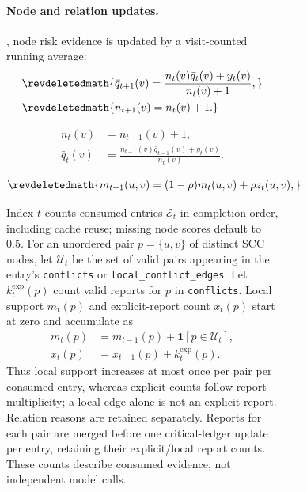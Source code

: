 \documentclass[11pt]{article}
\begin{document}
\begin{figure}[!t]
\begin{figure}[!t]
\paragraph{Node and relation updates.}
, node risk evidence is updated by a visit-counted running average:
\ifrevisionmarks
\[
\begin{aligned}
    &\revdeletedmath{\bar{q}_{t+1}(v)=
    \frac{n_t(v)\bar{q}_t(v)+y_t(v)}
    {n_t(v)+1},}\\
    &\revdeletedmath{n_{t+1}(v)=n_t(v)+1.}
\end{aligned}
\]
\fi
\begin{revadded}
\begin{equation}
    \begin{aligned}
    n_t(v)&=n_{t-1}(v)+1,\\
    \bar q_t(v)&=\frac{n_{t-1}(v)\bar q_{t-1}(v)+y_t(v)}{n_t(v)}.
    \end{aligned}
    \label{eq:node-update}
\end{equation}
\end{revadded}
\ifrevisionmarks
\[
    \revdeletedmath{m_{t+1}(u,v)=(1-\rho)m_t(u,v)+\rho z_t(u,v),}
\]
\fi
{}
\begin{revadded}
Index $t$ counts consumed entries $\mathcal E_t$ in completion order, including cache reuse; missing node scores default to $0.5$. For an unordered pair $p=\{u,v\}$ of distinct SCC nodes, let $\mathcal U_t$ be the set of valid pairs appearing in the entry's \texttt{conflicts} or \texttt{local\_conflict\_edges}. Let $k_t^{\mathrm{exp}}(p)$ count valid reports for $p$ in \texttt{conflicts}. Local support $m_t(p)$ and explicit-report count $x_t(p)$ start at zero and accumulate as
\begin{equation}
    \begin{aligned}
    m_t(p)&=m_{t-1}(p)+\mathbf{1}[p\in\mathcal U_t],\\
    x_t(p)&=x_{t-1}(p)+k_t^{\mathrm{exp}}(p).
    \end{aligned}
    \label{eq:relation-update}
\end{equation}
Thus local support increases at most once per pair per consumed entry, whereas explicit counts follow report multiplicity; a local edge alone is not an explicit report. Relation reasons are retained separately. Reports for each pair are merged before one critical-ledger update per entry, retaining their explicit/local report counts. These counts describe consumed evidence, not independent model calls.


\end{revadded}
\end{figure}
\end{figure}
\end{document}
